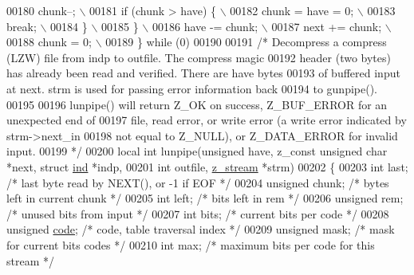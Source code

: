 \begin{DoxyCode}
00180 \textcolor{preprocessor}{            chunk--; \(\backslash\)}
00181 \textcolor{preprocessor}{            if (chunk > have) \{ \(\backslash\)}
00182 \textcolor{preprocessor}{                chunk = have = 0; \(\backslash\)}
00183 \textcolor{preprocessor}{                break; \(\backslash\)}
00184 \textcolor{preprocessor}{            \} \(\backslash\)}
00185 \textcolor{preprocessor}{        \} \(\backslash\)}
00186 \textcolor{preprocessor}{        have -= chunk; \(\backslash\)}
00187 \textcolor{preprocessor}{        next += chunk; \(\backslash\)}
00188 \textcolor{preprocessor}{        chunk = 0; \(\backslash\)}
00189 \textcolor{preprocessor}{    \} while (0)}
00190 
00191 \textcolor{comment}{/* Decompress a compress (LZW) file from indp to outfile.  The compress magic}
00192 \textcolor{comment}{   header (two bytes) has already been read and verified.  There are have bytes}
00193 \textcolor{comment}{   of buffered input at next.  strm is used for passing error information back}
00194 \textcolor{comment}{   to gunpipe().}
00195 \textcolor{comment}{}
00196 \textcolor{comment}{   lunpipe() will return Z\_OK on success, Z\_BUF\_ERROR for an unexpected end of}
00197 \textcolor{comment}{   file, read error, or write error (a write error indicated by strm->next\_in}
00198 \textcolor{comment}{   not equal to Z\_NULL), or Z\_DATA\_ERROR for invalid input.}
00199 \textcolor{comment}{ */}
00200 local \textcolor{keywordtype}{int} lunpipe(\textcolor{keywordtype}{unsigned} have, z\_const \textcolor{keywordtype}{unsigned} \textcolor{keywordtype}{char} *next, \textcolor{keyword}{struct} \hyperlink{structind}{ind} *indp,
00201                   \textcolor{keywordtype}{int} outfile, \hyperlink{structz__stream__s}{z\_stream} *strm)
00202 \{
00203     \textcolor{keywordtype}{int} last;                   \textcolor{comment}{/* last byte read by NEXT(), or -1 if EOF */}
00204     \textcolor{keywordtype}{unsigned} chunk;             \textcolor{comment}{/* bytes left in current chunk */}
00205     \textcolor{keywordtype}{int} left;                   \textcolor{comment}{/* bits left in rem */}
00206     \textcolor{keywordtype}{unsigned} rem;               \textcolor{comment}{/* unused bits from input */}
00207     \textcolor{keywordtype}{int} bits;                   \textcolor{comment}{/* current bits per code */}
00208     \textcolor{keywordtype}{unsigned} \hyperlink{structcode}{code};              \textcolor{comment}{/* code, table traversal index */}
00209     \textcolor{keywordtype}{unsigned} mask;              \textcolor{comment}{/* mask for current bits codes */}
00210     \textcolor{keywordtype}{int} max;                    \textcolor{comment}{/* maximum bits per code for this stream */}

\end{DoxyCode}
